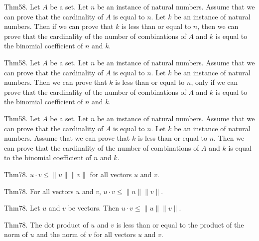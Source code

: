 \documentclass{article}
\begin{document}
Thm58. Let $A$ be a set. Let $n$ be an instance of natural numbers. Assume that we can prove that the cardinality of $A$ is equal to $n$. Let $k$ be an instance of natural numbers. Then if we can prove that $k$ is less than or equal to $n$, then we can prove that the cardinality of the number of combinations of $A$ and $k$ is equal to the binomial coefficient of $n$ and $k$.

Thm58. Let $A$ be a set. Let $n$ be an instance of natural numbers. Assume that we can prove that the cardinality of $A$ is equal to $n$. Let $k$ be an instance of natural numbers. Then we can prove that $k$ is less than or equal to $n$, only if we can prove that the cardinality of the number of combinations of $A$ and $k$ is equal to the binomial coefficient of $n$ and $k$.

Thm58. Let $A$ be a set. Let $n$ be an instance of natural numbers. Assume that we can prove that the cardinality of $A$ is equal to $n$. Let $k$ be an instance of natural numbers. Assume that we can prove that $k$ is less than or equal to $n$. Then we can prove that the cardinality of the number of combinations of $A$ and $k$ is equal to the binomial coefficient of $n$ and $k$.

Thm78. $u \cdot v \leq \| u \| \| v \|$ for all vectors $u$ and $v$.

Thm78. For all vectors $u$ and $v$, $u \cdot v \leq \| u \| \| v \|$.

Thm78. Let $u$ and $v$ be vectors. Then $u \cdot v \leq \| u \| \| v \|$.

Thm78. The dot product of $u$ and $v$ is less than or equal to the product of the norm of $u$ and the norm of $v$ for all vectors $u$ and $v$.
\end{document}
